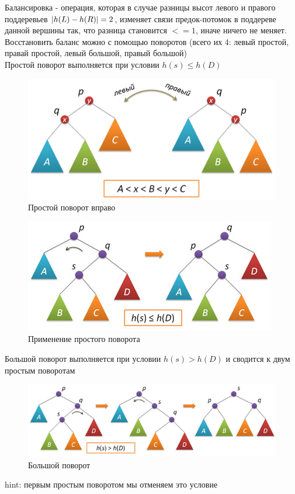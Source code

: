 \documentclass[discrete.tex]{subfiles}
\begin{document}
\begin{definition} [Балансировка]
    Балансировка - операция, которая в случае разницы высот левого и правого поддеревьев 
    $\left|h(L) - h(R)\right| = 2$, изменяет связи предок-потомок 
    в поддереве данной вершины так, что разница 
    становится $<= 1$, иначе ничего не меняет.\\
    Восстановить баланс можно с помощью поворотов (всего их 4: левый простой, 
    правай простой, левый большой, правый большой)\\
    Простой поворот выполняется при условии $h(s) \leq h(D)$
    \begin{figure}[H]
        \caption{Простой поворот вправо}
        \includegraphics[scale=0.5]{pics/33_1.png}
        \centering
    \end{figure}
    
    \begin{figure}[H]
        \caption{Применение простого поворота}
        \includegraphics[scale=0.5]{pics/33_2.jpg}
        \centering
    \end{figure}
    Большой поворот выполняется при условии $h(s) > h(D)$ и сводится к двум простым 
    поворотам
    \begin{figure}[H]
        \caption{Большой поворот}
        \includegraphics[scale=0.5]{pics/33_3.jpg}
        \centering
    \end{figure}
    hint: первым простым поворотом мы отменяем это условие

\end{definition}
\end{document}
